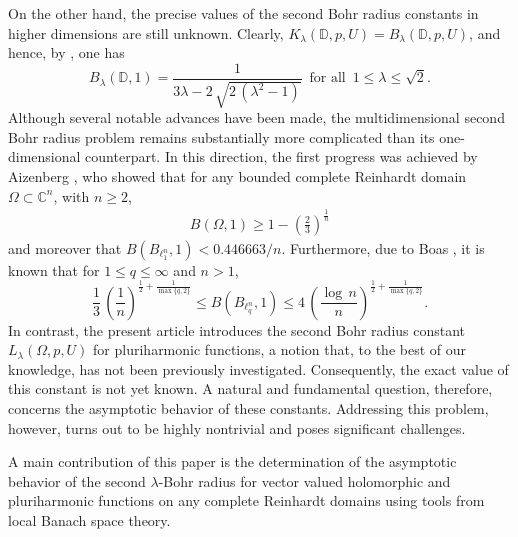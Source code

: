 \documentclass[a4paper,11pt, reqno]{amsart}
\theoremstyle{definition}
\newcounter {own}
\begin{document}
	On the other hand, the precise values of the second Bohr radius constants in higher dimensions are still unknown. Clearly, $K_{\lambda}(\mathbb{D}, p,U)=B_{\lambda}(\mathbb{D}, p,U)$, and hence, by \cite{bombieri-2004}, one has
	$$
	B_{\lambda}(\mathbb{D}, 1) =\frac{1}{3\lambda- 2\,\sqrt{2\,(\lambda^2 -1)}}\,\,\, \mbox{for all}\,\,\, 1\leq \lambda \leq \sqrt{2}.
	$$
	\noindent Although several notable advances have been made, the multidimensional second Bohr radius problem remains substantially more complicated than its one-dimensional counterpart. In this direction, the first progress was achieved by Aizenberg \cite{aizn-2000a}, who showed that for any bounded complete Reinhardt domain $\Omega \subset \mathbb{C}^n$, with $n \geq 2$,
	\begin{align*}
	B(\Omega, 1) \geq 1- \left(\frac{2}{3}\right)^{\frac{1}{n}}
	\end{align*}
	and moreover that $B(B_{\ell^n_1}, 1)< 0.446663/n$. Furthermore, due to Boas \cite{boas-2000}, it is known that for $1\leq q \leq \infty$ and $n>1$, 
	\begin{equation} \label{e-lower-snd}
		\frac{1}{3}\, \left(\frac{1}{n}\right)^{\frac{1}{2}+\frac{1}{\max\{q,2\}}} \leq B(B_{\ell^n_q},1) \leq 4 \,\left(\frac{\log\,n}{n}\right)^{\frac{1}{2}+\frac{1}{\max\{q,2\}}}.
	\end{equation}
In contrast, the present article introduces the second Bohr radius constant $L_{\lambda}(\Omega, p,U)$ for pluriharmonic functions, a notion that, to the best of our knowledge, has not been previously investigated. Consequently, the exact value of this constant is not yet known. A natural and fundamental question, therefore, concerns the asymptotic behavior of these constants. Addressing this problem, however, turns out to be highly nontrivial and poses significant challenges.
	\vspace{1mm}	
		
	A main contribution of this paper is the determination of the asymptotic behavior of the second $\lambda$-Bohr radius for vector valued holomorphic and pluriharmonic functions on any complete Reinhardt domains using tools from local Banach space theory.
	\vspace{1mm}
	
\end{document}
